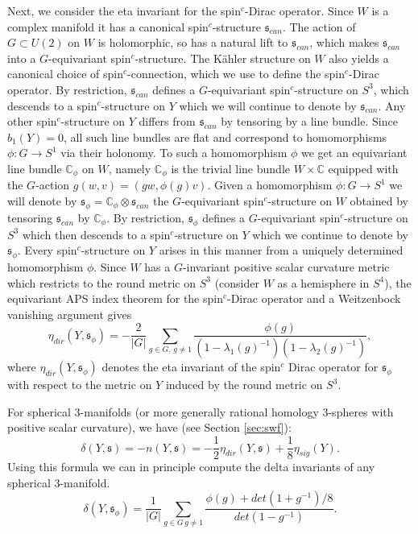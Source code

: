 \documentclass{amsart}
\theoremstyle{definition}
\theoremstyle{remark}
\numberwithin{equation}{section}
\begin{document}
Next, we consider the eta invariant for the spin$^c$-Dirac operator. Since $W$ is a complex manifold it has a canonical spin$^c$-structure $\mathfrak{s}_{can}$. The action of $G \subset U(2)$ on $W$ is holomorphic, so has a natural lift to $\mathfrak{s}_{can}$, which makes $\mathfrak{s}_{can}$ into a $G$-equivariant spin$^c$-structure. The K\"ahler structure on $W$ also yields a canonical choice of spin$^c$-connection, which we use to define the spin$^c$-Dirac operator. By restriction, $\mathfrak{s}_{can}$ defines a $G$-equivariant spin$^c$-structure on $S^3$, which descends to a spin$^c$-structure on $Y$ which we will continue to denote by $\mathfrak{s}_{can}$. Any other spin$^c$-structure on $Y$ differs from $\mathfrak{s}_{can}$ by tensoring by a line bundle. Since $b_1(Y) = 0$, all such line bundles are flat and correspond to homomorphisms $\phi : G \to S^1$ via their holonomy. To such a homomorphism $\phi$ we get an equivariant line bundle $\mathbb{C}_\phi$ on $W$, namely $\mathbb{C}_\phi$ is the trivial line bundle $W \times \mathbb{C}$ equipped with the $G$-action $g(w,v) = (gw , \phi(g)v)$. Given a homomorphism $\phi : G \to S^1$ we will denote by $\mathfrak{s}_\phi = \mathbb{C}_\phi \otimes \mathfrak{s}_{can}$ the $G$-equivariant spin$^c$-structure on $W$ obtained by tensoring $\mathfrak{s}_{can}$ by $\mathbb{C}_\phi$. By restriction, $\mathfrak{s}_\phi$ defines a $G$-equivariant spin$^c$-structure on $S^3$ which then descends to a spin$^c$-structure on $Y$ which we continue to denote by $\mathfrak{s}_\phi$. Every spin$^c$-structure on $Y$ arises in this manner from a uniquely determined homomorphism $\phi$. Since $W$ has a $G$-invariant positive scalar curvature metric which restricts to the round metric on $S^3$ (consider $W$ as a hemisphere in $S^4$), the equivariant APS index theorem for the spin$^c$-Dirac operator and a Weitzenbock vanishing argument gives
\[
\eta_{dir}(Y , \mathfrak{s}_\phi) = -\frac{2}{|G|} \sum_{g \in G, \, g \neq 1} \frac{ \phi(g) }{(1 - \lambda_1(g)^{-1})(1-\lambda_2(g)^{-1})},
\]
where $\eta_{dir}(Y , \mathfrak{s}_\phi)$ denotes the eta invariant of the spin$^c$ Dirac operator for $\mathfrak{s}_\phi$ with respect to the metric on $Y$ induced by the round metric on $S^3$.

For spherical $3$-manifolds (or more generally rational homology $3$-spheres with positive scalar curvature), we have (see Section \ref{sec:swf}):
\[
\delta( Y , \mathfrak{s} ) = -n( Y , \mathfrak{s}) = -\frac{1}{2} \eta_{dir}(Y , \mathfrak{s}) + \frac{1}{8} \eta_{sig}(Y).
\]
Using this formula we can in principle compute the delta invariants of any spherical $3$-manifold. 
\[
\delta(Y , \mathfrak{s}_\phi) = \frac{1}{|G|} \sum_{g \in G \, g \neq 1} \frac{ \phi(g) + det(1+g^{-1})/8}{det(1-g^{-1})}.
\]
\end{document}
